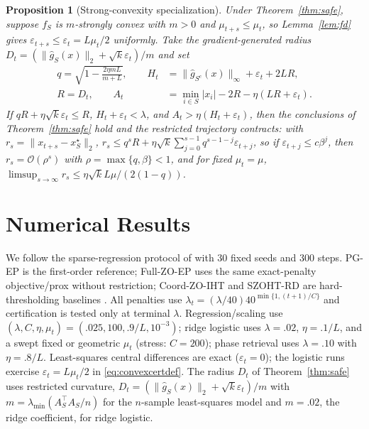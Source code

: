 \documentclass{article}
\newtheorem{proposition}{Proposition}
\newcommand{\eps}{\varepsilon}
\begin{document}
\begin{proposition}[Strong-convexity specialization]\label{prop:rsc}
Under Theorem~\ref{thm:safe}, suppose $f_S$ is $m$-strongly convex with $m>0$ and $\mu_{t+s}\le\mu_t$, so Lemma~\ref{lem:fd} gives $\eps_{t+s}\le\eps_t=L\mu_t/2$ uniformly. Take the gradient-generated radius $D_t=(\|\widehat g_S(x)\|_2+\sqrt{k}\eps_t)/m$ and set
\begin{align}
q=\sqrt{1-\tfrac{2\eta mL}{m+L}},\qquad
H_t&=\|\widehat g_{S^c}(x)\|_\infty+\eps_t+2LR,\nonumber\\
R=D_t,\qquad
A_t&=\min_{i\in S}|x_i|-2R-\eta(LR+\eps_t).
\label{eq:rscdef}
\end{align}
If $qR+\eta\sqrt{k}\eps_t\le R$, $H_t+\eps_t<\lambda$, and $A_t>\eta(H_t+\eps_t)$, then the conclusions of Theorem~\ref{thm:safe} hold and the restricted trajectory contracts: with $r_s=\|x_{t+s}-x_S^\star\|_2$,
$r_s\le q^sR+\eta\sqrt{k}\sum_{j=0}^{s-1}q^{s-1-j}\eps_{t+j}$,
so if $\eps_{t+j}\le c\beta^j$, then $r_s=\mathcal O(\rho^s)$ with $\rho=\max\{q,\beta\}<1$, and for fixed $\mu_t=\mu$, $\limsup_{s\to\infty}r_s\le\eta\sqrt{k}L\mu/(2(1-q))$.
\end{proposition}

\section{Numerical Results}
We follow the sparse-regression protocol of \cite{zhao2026exact} with $30$ fixed seeds and $300$ steps. PG-EP is the first-order reference; Full-ZO-EP uses the same exact-penalty objective/prox without restriction; Coord-ZO-IHT and SZOHT-RD are hard-thresholding baselines \cite{blumensath2007iht,devazelhes2022zeroth}. All penalties use $\lambda_t=(\lambda/40)40^{\min\{1,(t+1)/C\}}$ and certification is tested only at terminal $\lambda$. Regression/scaling use $(\lambda,C,\eta,\mu_t)=(.025,100,.9/L,10^{-3})$; ridge logistic uses $\lambda=.02$, $\eta=.1/L$, and a swept fixed or geometric $\mu_t$ (stress: $C=200$); phase retrieval uses $\lambda=.10$ with $\eta=.8/L$. Least-squares central differences are exact ($\eps_t=0$); the logistic runs exercise $\eps_t=L\mu_t/2$ in \eqref{eq:convexcertdef}. The radius $D_t$ of Theorem~\ref{thm:safe} uses restricted curvature, $D_t=(\|\widehat g_S(x)\|_2+\sqrt{k}\eps_t)/m$ with $m=\lambda_{\min}(A_S^\top A_S/n)$ for the $n$-sample least-squares model and $m=.02$, the ridge coefficient, for ridge logistic.
\end{document}

